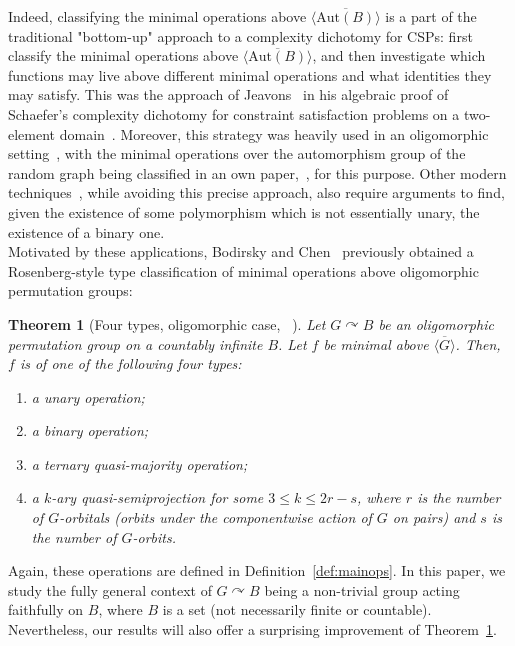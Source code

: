 \documentclass{article}
\newtheorem{theorem}{Theorem}[section]
\theoremstyle{remark}
\theoremstyle{definition}
\def\acts{\curvearrowright}
\begin{document}
Indeed, classifying the minimal operations above $\overline{\langle\mathrm{Aut}(B)\rangle}$ is a part of the traditional "bottom-up" approach to a complexity dichotomy for CSPs: first classify the minimal operations above $\overline{\langle \mathrm{Aut}(B)\rangle}$, and then investigate %
 which functions may live above different minimal operations and what identities they may satisfy. This was the approach of Jeavons~\cite{jeavons1998algebraic} in his algebraic proof of Schaefer's complexity dichotomy for constraint satisfaction problems on a two-element domain~\cite{schaefer1978complexity}. Moreover, this strategy was heavily used in an oligomorphic setting~\cite{bodirsky2010complexity, bodirsky2015schaefer, kompatscher2018complexity, bodirsky2019constraint}, with the minimal operations over the automorphism group of the random graph being classified in an own paper,~\cite{minrandom},  for this purpose. Other modern techniques~\cite{Smoothapp, mottet2023order, feller2024algebraic, bitter2024generalized}, while avoiding this precise approach,  also require arguments to find, given the existence of some polymorphism which is not essentially unary, the existence of a binary one.\\

Motivated by these applications, Bodirsky and Chen~\cite{BodChen} previously obtained a Rosenberg-style type classification of minimal operations above oligomorphic permutation groups:
\begin{theorem}[Four types, oligomorphic case, ~\cite{BodChen, BodCSP}] \label{thm:fourtypesbodchen} Let $G\acts B$ be an oligomorphic permutation group on a countably infinite $B$. Let $f$ be minimal above $\overline{\langle G\rangle}$. Then, $f$ is of one of the following four types:
    \begin{enumerate}
    \item a unary operation;
    \item a binary operation;
    \item a ternary quasi-majority operation;
    \item a $k$-ary quasi-semiprojection for some $3\leq k\leq 2r-s$, where $r$ is the number of $G$-orbitals (orbits under the componentwise action of $G$ on pairs) and $s$ is the number of $G$-orbits.
\end{enumerate}
\end{theorem}
Again, these operations are defined in Definition~\ref{def:mainops}. In this paper, we study the fully general context of $G\acts B$ being a non-trivial group acting faithfully on $B$, where $B$ is a set (not necessarily finite or countable). Nevertheless, our results will also offer a surprising  improvement of Theorem~\ref{thm:fourtypesbodchen}. 
\end{document}
